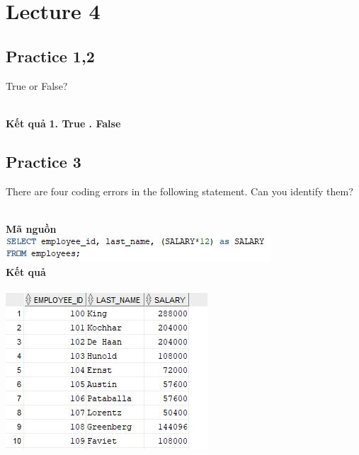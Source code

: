 \documentclass[12pt,a4paper]{report}
\begin{document}
\section{Lecture 4}
\subsection{Practice 1,2}
\begin{boxedminipage}[t]{3cm}
	True or False?
\end{boxedminipage}\\
\newline
\textbf{Kết quả} \qquad
\textbf{1. True . False}

\subsection{Practice 3}
\begin{boxedminipage}[t]{15.5cm}
	There are four coding errors in the following statement. Can you identify them?
\end{boxedminipage}
\newline
\\
\textbf{Mã nguồn}
\\
\newline
\includegraphics[scale=1]{34.jpg}\\
\textbf{Kết quả}\\\\
\includegraphics[scale=1]{k34.jpg}
\end{document}
